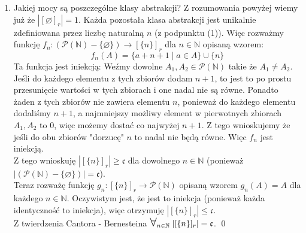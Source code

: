 \documentclass[10pt]{article}
\newcommand{\N}{\mathbb{N}}
\newcommand{\Pows}{\mathcal{P}}
\newcommand{\cont}{\mathfrak{c}}
\newcommand{\Forall}{{\Large\mbox{$\forall$}}}
\begin{document}
\begin{enumerate}[1)]
    \item Jakiej mocy są poszczególne klasy abstrakcji?
    Z rozumowania powyżej wiemy już że $|[\varnothing]_r| = 1$. Każda pozostała klasa abstrakcji jest unikalnie zdefiniowana przez liczbę naturalną $n$ (z podpunktu (1)). Więc rozważmy funkcję $f_n \colon (\Pows (\N) - \{\varnothing \} ) \to [\{n\}]_r$ dla $n \in \N$ opisaną wzorem:
    $$f_n(A) = \{a + n + 1 \mid a \in A\} \cup \{n\}$$
    Ta funkcja jest iniekcją: 
    Weźmy dowolne $A_1, A_2 \in \Pows (\N)$ takie że $A_1 \neq A_2$. Jeśli do każdego elementu z tych zbiorów dodam $n + 1$, to jest to po prostu przesunięcie wartości w tych zbiorach i one nadal nie są równe. Ponadto żaden z tych zbiorów nie zawiera elementu $n$, ponieważ do każdego elementu dodaliśmy $n + 1$, a najmniejszy możliwy element w pierwotnych zbiorach $A_1, A_2$ to $0$, więc możemy dostać co najwyżej $n + 1$. Z tego wnioskujemy że jeśli do obu zbiorów "dorzucę" $n$ to nadal nie będą równe. Więc $f_n$ jest iniekcją. \\[5pt]
    Z tego wnioskuję $|[\{n\}]_r| \geq \cont$ dla dowolnego $n \in \N$ (ponieważ $|(\Pows (\N) - \{\varnothing \} )| = \cont$). \\[10pt]
    Teraz rozważę funkcję $g_n \colon [\{n\}]_r \to \Pows (\N)$ opisaną wzorem $g_n(A) = A$ dla każdego $n \in \N$. Oczywistym jest, że jest to iniekcja (ponieważ każda identyczność to iniekcja), więc otrzymuję $|[\{n\}]_r| \leq \cont$. \\[5pt]
    Z twierdzenia Cantora - Bernesteina $\Forall_{n \in \N} \; |[\{n\}]_r| = \cont$. \qed
\end{enumerate}
\end{document}
